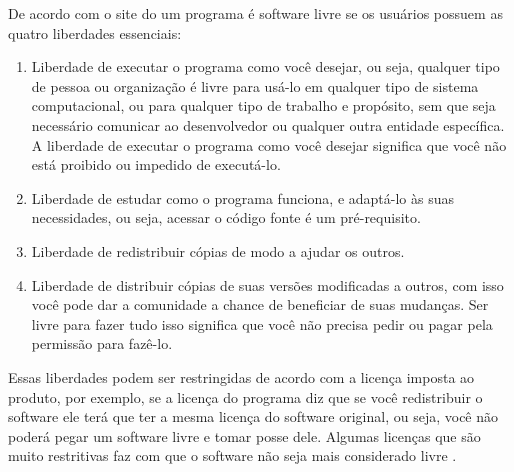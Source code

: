 De acordo com o site do \cite{gnu} um programa é software livre se os usuários possuem as quatro liberdades essenciais:

\begin{enumerate}
  \item Liberdade de executar o programa como você desejar, ou seja, qualquer tipo de pessoa ou organização é livre para usá-lo em qualquer tipo de sistema computacional, ou para qualquer tipo de trabalho e propósito, sem que seja necessário comunicar ao desenvolvedor ou qualquer outra entidade específica. A liberdade de executar o programa como você desejar significa que você não está proibido ou impedido de executá-lo.
  \item Liberdade de estudar como o programa funciona, e adaptá-lo às suas necessidades, ou seja, acessar o código fonte é um pré-requisito.
  \item Liberdade de redistribuir cópias de modo a ajudar os outros.
  \item Liberdade de distribuir cópias de suas versões modificadas a outros, com isso você pode dar a comunidade a chance de beneficiar de suas mudanças. Ser livre para fazer tudo isso significa que você não precisa pedir ou pagar pela permissão para fazê-lo.
\end{enumerate}

Essas liberdades podem ser restringidas de acordo com a licença imposta ao produto, por exemplo, se a licença do
programa diz que se você redistribuir o software ele terá que ter a mesma licença do software original, ou seja, você
não poderá pegar um software livre e tomar posse dele. Algumas licenças que são muito restritivas faz com que o software
não seja mais considerado livre \cite{gnu}.
